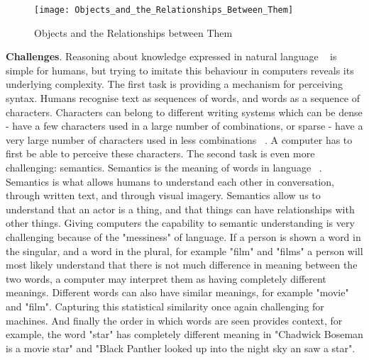 \begin{figure}
  	\caption{Objects and the Relationships between Them}
   	\centering
    	\texttt{[image: Objects\_and\_the\_Relationships\_Between\_Them]}
\end{figure}

\textbf{Challenges}. Reasoning about knowledge expressed in natural language ~\citep{minervini2019differentiable} is simple for humans, but trying to imitate this behaviour in computers reveals its underlying complexity. \newline 
The first task is providing a mechanism for perceiving syntax. Humans recognise text as sequences of words, and words as a sequence of characters. Characters can belong to different writing systems which can be dense - have a few characters used in a large number of combinations, or sparse - have a very large number of characters used in less combinations ~\citep{Hua2010}. A computer has to first be able to perceive these characters. \newline
The second task is even more challenging: semantics. Semantics is the meaning of words in language ~\citep{chomsky1955logical}. Semantics is what allows humans to understand each other in conversation, through written text, and through visual imagery. Semantics allow us to understand that an actor is a thing, and that things can have relationships with other things. Giving computers the capability to semantic understanding is very challenging because of the "messiness" of language. If a person is shown a word in the singular, and a word in the plural, for example "film" and "films" a person will most likely understand that there is not much difference in meaning between the two words, a computer may interpret them as having completely different meanings. Different words can also have similar meanings, for example "movie" and "film". Capturing this statistical similarity once again challenging for machines. And finally the order in which words are seen provides context, for example, the word "star" has completely different meaning in "Chadwick Boseman is a movie star" and "Black Panther looked up into the night sky an saw a star". \newline
